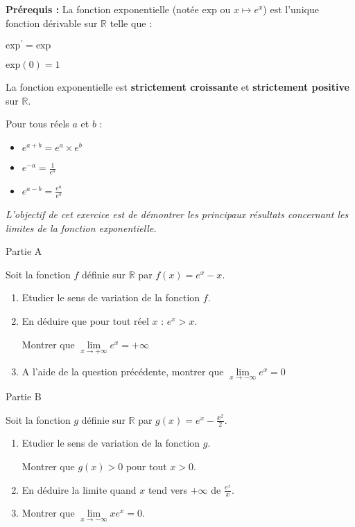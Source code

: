 
%
\textbf{Prérequis : }
La fonction exponentielle (notée $\text{exp}$ ou $x\mapsto e^{x}$) est l'unique fonction dérivable sur $\mathbb{R}$ telle que :
\par
$\text{exp}^{\prime}=\text{exp}$
\par
$\text{exp}\left(0\right)=1$
\par
La fonction exponentielle est \textbf{strictement croissante} et \textbf{strictement positive} sur $\mathbb{R}$.
\par
Pour tous réels $a$ et $b$ :
\begin{itemize}
     \item
     $e^{a+b}=e^{a}\times e^{b}$
     \item
     $e^{-a}=\frac{1}{e^{a}}$
     \item
     $e^{a-b}=\frac{e^{a}}{e^{b}}$
\end{itemize}
\textit{L'objectif de cet exercice est de démontrer les principaux résultats concernant les limites de la fonction exponentielle.}
\begin{h3}Partie A\end{h3}
Soit la fonction $ f $ définie sur $\mathbb{R}$ par $f\left(x\right)=e^{x}-x$.
\begin{enumerate}
     \item
     Etudier le sens de variation de la fonction $f$.
     \item
     En déduire que pour tout réel $x$ : $e^{x} > x$.
     \par
     Montrer que $\lim\limits_{x\rightarrow +\infty }e^{x}=+\infty $
     \item
     A l'aide de la question précédente, montrer que $\lim\limits_{x\rightarrow -\infty }e^{x}=0$
\end{enumerate}
\begin{h3}Partie B\end{h3}
Soit la fonction $g$ définie sur $\mathbb{R}$ par $g\left(x\right)=e^{x}-\frac{x^{2}}{2}$.
\begin{enumerate}
     \item
     Etudier le sens de variation de la fonction $g$.
     \par
     Montrer que $g\left(x\right) > 0$ pour tout $x > 0$.
     \item
     En déduire la limite quand $x$ tend vers $+\infty $ de $\frac{e^{x}}{x}$.
     \item
     Montrer que $\lim\limits_{x\rightarrow -\infty }x e^{x}=0$.
\end{enumerate}
